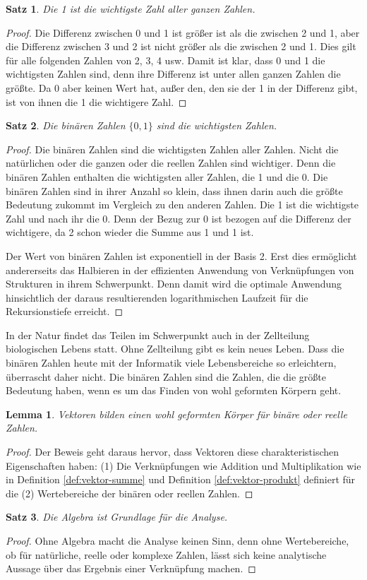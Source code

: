 \documentclass{report}
\newtheorem{satz}{Satz}[section]
\newtheorem{lemma}{Lemma}[section]
\numberwithin{equation}{section}
\begin{document}
\begin{satz}
	Die 1 ist die wichtigste Zahl aller ganzen Zahlen. 
\end{satz}
\begin{proof}
	Die Differenz zwischen 0 und 1 ist größer ist als die zwischen 2 und 1, aber die Differenz zwischen 3 und 2 ist nicht größer als die zwischen 2 und 1. Dies gilt für alle folgenden Zahlen von 2, 3, 4 usw. Damit ist klar, dass 0 und 1 die wichtigsten Zahlen sind, denn ihre Differenz ist unter allen ganzen Zahlen die größte. Da 0 aber keinen Wert hat, außer den, den sie der 1 in der Differenz gibt, ist von ihnen die 1 die wichtigere Zahl.
\end{proof}
\begin{satz}
	Die binären Zahlen $\{0, 1\}$ sind die wichtigsten Zahlen. 
\end{satz}
\begin{proof}
	Die binären Zahlen sind die wichtigsten Zahlen aller Zahlen. Nicht die natürlichen oder die ganzen oder die reellen Zahlen sind wichtiger. Denn die binären Zahlen enthalten die wichtigsten aller Zahlen, die 1 und die 0. Die binären Zahlen sind in ihrer Anzahl so klein, dass ihnen darin auch die größte Bedeutung zukommt im Vergleich zu den anderen Zahlen. Die 1 ist die wichtigste Zahl und nach ihr die 0. Denn der Bezug zur 0 ist bezogen auf die Differenz der wichtigere, da 2 schon wieder die Summe aus 1 und 1 ist. 
	
	Der Wert von binären Zahlen ist exponentiell in der Basis 2. Erst dies ermöglicht andererseits das Halbieren in der effizienten Anwendung von Verknüpfungen von Strukturen in ihrem Schwerpunkt. Denn damit wird die optimale Anwendung hinsichtlich der daraus resultierenden logarithmischen Laufzeit für die Rekursionstiefe erreicht.
\end{proof}
In der Natur findet das Teilen im Schwerpunkt auch in der Zellteilung biologischen Lebens statt. Ohne Zellteilung gibt es kein neues Leben. Dass die binären Zahlen heute mit der Informatik viele Lebensbereiche so erleichtern, überrascht daher nicht. Die binären Zahlen sind die Zahlen, die die größte Bedeutung haben, wenn es um das Finden von wohl geformten Körpern geht.
\begin{lemma}
	Vektoren bilden einen wohl geformten Körper für binäre oder reelle Zahlen.
\end{lemma}
\begin{proof}
	Der Beweis geht daraus hervor, dass Vektoren diese charakteristischen Eigenschaften haben: (1) Die Verknüpfungen wie  Addition und Multiplikation wie in Definition \ref{def:vektor-summe} und Definition \ref{def:vektor-produkt} definiert für die (2) Wertebereiche der binären oder reellen Zahlen.
\end{proof}
\begin{satz}
	Die Algebra ist Grundlage für die Analyse.
\end{satz}
\begin{proof}
Ohne Algebra macht die Analyse keinen Sinn, denn ohne Wertebereiche, ob für natürliche, reelle oder komplexe Zahlen, lässt sich keine analytische Aussage über das Ergebnis einer Verknüpfung machen.
\end{proof}
\end{document}
